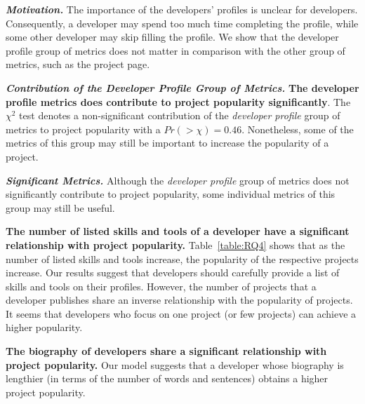 


\noindent \textbf{\RQfour}



\vspace{0.1cm}

\noindent\textbf{\textit{Motivation.}} 
The importance of the developers' profiles is unclear for developers. Consequently, a developer may spend too much time completing the profile, while some other developer may skip filling the profile. We show that the developer profile group of metrics does not matter in comparison with the other group of metrics, such as the project page. 

\vspace{0.1cm}

\noindent\textbf{\textit{Contribution of the Developer Profile Group of Metrics.}} \textbf{The developer profile metrics does contribute to project popularity significantly}. The $\chi^2$ test denotes a non-significant contribution of the {\em developer profile} group of metrics to project popularity with a $Pr(>\chi)=0.46$. Nonetheless, some of the metrics of this group
may still be important to increase the popularity of a project.

\vspace{0.1cm}

\noindent\textbf{\textit{Significant Metrics.}} Although the {\em developer profile} group of metrics does not significantly contribute to project popularity, some individual metrics of this group may still be useful.



\textbf{The number of listed skills and tools of a developer have a significant relationship with project popularity.}
Table~\ref{table:RQ4} shows that as the number of listed skills and tools increase, the popularity of the respective projects increase. Our results suggest that developers should carefully provide a list of skills and tools on their profiles. However, the number of projects that a developer publishes share an inverse relationship with the popularity of projects. It seems that developers who focus on one project (or few projects) can achieve a higher popularity. 

\textbf{The biography of developers share a significant relationship with project popularity.} Our model suggests that a developer whose biography is lengthier (in terms of the number of words and sentences) obtains a higher project popularity.


